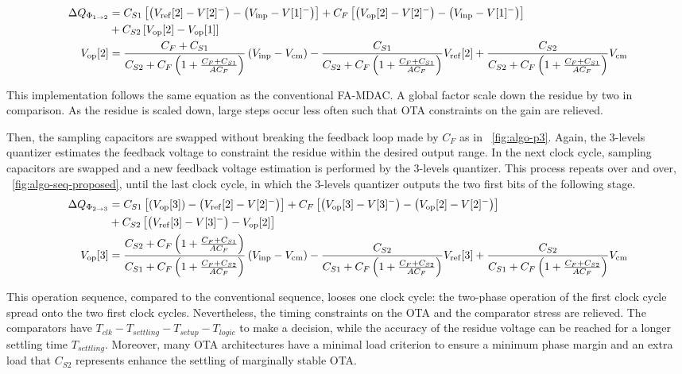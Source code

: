 \begin{align}
 \Delta Q_{\Phi_{1 \rightarrow 2}} &= C_{S1} \left[\left(V_{\rm ref}[2]-V[2]^- \right) - \left(V_{\rm inp}-V[1]^- \right) \right] + C_{F} \left[\left(V_{\rm op}[2]-V[2]^- \right) - \left(V_{\rm inp}-V[1]^- \right) \right] \\
 &+ C_{S2} \left[V_{\rm op}[2]-V_{\rm op}[1] \right] \nonumber \\
 V_{\rm op}[2] &= \frac{C_F + C_{S1}}{C_{S2}+C_F\left(1+\frac{C_F+C_{S1}}{AC_F} \right)} \left(V_{\rm inp}-V_{\rm cm} \right) - \frac{C_{S1}}{C_{S2}+C_F\left(1+\frac{C_F+C_{S1}}{AC_F} \right)} V_{\rm ref}[2] + \frac{C_{S2}}{C_{S2}+C_F\left(1+\frac{C_F+C_{S1}}{AC_F} \right)} V_{\rm cm}
 \label{eqn:algo_res_p2}
\end{align}

This implementation follows the same equation as the conventional FA-MDAC\@. A global factor scale down the residue by two in comparison. As the residue is scaled down, large steps occur less often such that OTA constraints on the gain are relieved.

Then, the sampling capacitors are swapped without breaking the feedback loop made by \(C_F\) as in \figurename~\ref{fig:algo-p3}. Again, the 3-levels quantizer estimates the feedback voltage to constraint the residue within the desired output range. In the next clock cycle, sampling capacitors are swapped and a new feedback voltage estimation is performed by the 3-levels quantizer. This process repeats over and over, \figurename~\ref{fig:algo-seq-proposed}, until the last clock cycle, in which the 3-levels quantizer outputs the two first bits of the following stage.
\rm 
\begin{align}
	\Delta Q_{\Phi_{2 \rightarrow 3}} &= C_{S1} \left[\left(V_{\rm op}[3] \right) - \left(V_{\rm ref}[2]-V[2]^- \right) \right] + C_{F} \left[\left(V_{\rm op}[3]-V[3]^- \right) - \left(V_{\rm op}[2]-V[2]^- \right) \right] \\
	&+ C_{S2} \left[\left(V_{\rm ref}[3] - V[3]^- \right) - V_{\rm op}[2] \right] \nonumber \\
	V_{\rm op}[3] &= \frac{C_{S2}+C_F\left(1+\frac{C_F+C_{S1}}{AC_F} \right)}{C_{S1}+C_F\left(1+\frac{C_F+C_{S2}}{AC_F} \right)} \left(V_{\rm inp}-V_{\rm cm} \right) - \frac{C_{S2}}{C_{S1}+C_F\left(1+\frac{C_F+C_{S2}}{AC_F} \right)} V_{\rm ref}[3] + \frac{C_{S2}}{C_{S1}+C_F\left(1+\frac{C_F+C_{S2}}{AC_F} \right)} V_{\rm cm}
	\label{eqn:algo_res_p3}
   \end{align}

This operation sequence, compared to the conventional sequence, looses one clock cycle: the two-phase operation of the first clock cycle spread onto the two first clock cycles. Nevertheless, the timing constraints on the OTA and the comparator stress are relieved. The comparators have \(T_{clk}-T_{settling}-T_{setup}-T_{logic}\) to make a decision, while the accuracy of the residue voltage can be reached for a longer settling time \(T_{settling}\). Moreover, many OTA architectures have a minimal load criterion to ensure a minimum phase margin and an extra load that \(C_{S2}\) represents enhance the settling of marginally stable OTA\@.

